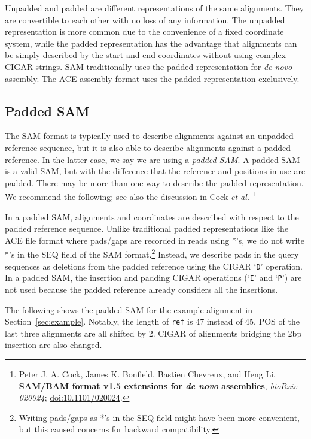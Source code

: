 \documentclass[10pt]{article}
\begin{document}
Unpadded and padded are different representations of the same alignments. They
are convertible to each other with no loss of any information. The unpadded
representation is more common due to the convenience of a fixed coordinate system,
while the padded representation has the advantage that alignments can be simply
described by the start and end coordinates without using complex CIGAR strings.
SAM traditionally uses the padded representation for {\it de novo} assembly.
The ACE assembly format uses the padded representation exclusively.

\subsection{Padded SAM}\label{sec:padded-sam}

The SAM format is typically used to describe alignments against an unpadded
reference sequence, but it is also able to describe alignments against a padded
reference. In the latter case, we say we are using a \emph{padded SAM}. A padded
SAM is a valid SAM, but with the difference that the reference and positions in
use are padded. There may be more than one way to describe the padded
representation.
We recommend the following; see also the discussion in Cock {\it et al.}%
\footnote{Peter J. A. Cock, James K. Bonfield, Bastien Chevreux, and Heng Li,
{\bf SAM/BAM format v1.5 extensions for \emph{de novo} assemblies},
{\sl bioRxiv 020024};
\href{http://dx.doi.org/10.1101/020024}{doi:10.1101/020024}.}

In a padded SAM, alignments and coordinates are described with respect to the
padded reference sequence. Unlike traditional padded representations like
the ACE file format where pads/gaps are recorded in reads using *'s, we do
not write *'s in the {\sf SEQ} field of the SAM format.\footnote{Writing
pads/gaps as *'s in the {\sf SEQ} field might have been more convenient, but
this caused concerns for backward compatibility.} Instead, we describe pads
in the query sequences as deletions from the padded reference using the
{\sf CIGAR} `{\tt D}' operation. In a padded SAM, the insertion and padding
CIGAR operations (`{\tt I}' and `{\tt P}') are not used because the padded
reference already considers all the insertions.

The following shows the padded SAM for the example alignment in Section~\ref{sec:example}.
Notably, the length of {\tt ref} is 47 instead of 45. {\sf POS} of the last
three alignments are all shifted by 2. {\sf CIGAR} of alignments bridging the
2bp insertion are also changed.
\end{document}
